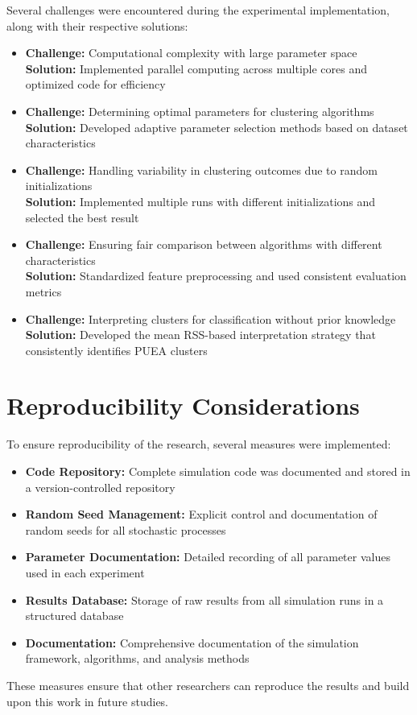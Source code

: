 Several challenges were encountered during the experimental implementation, along with their respective solutions:

\begin{itemize}
    \item \textbf{Challenge:} Computational complexity with large parameter space\\
    \textbf{Solution:} Implemented parallel computing across multiple cores and optimized code for efficiency
    
    \item \textbf{Challenge:} Determining optimal parameters for clustering algorithms\\
    \textbf{Solution:} Developed adaptive parameter selection methods based on dataset characteristics
    
    \item \textbf{Challenge:} Handling variability in clustering outcomes due to random initializations\\
    \textbf{Solution:} Implemented multiple runs with different initializations and selected the best result
    
    \item \textbf{Challenge:} Ensuring fair comparison between algorithms with different characteristics\\
    \textbf{Solution:} Standardized feature preprocessing and used consistent evaluation metrics
    
    \item \textbf{Challenge:} Interpreting clusters for classification without prior knowledge\\
    \textbf{Solution:} Developed the mean RSS-based interpretation strategy that consistently identifies PUEA clusters
\end{itemize}

\section{Reproducibility Considerations}

To ensure reproducibility of the research, several measures were implemented:

\begin{itemize}
    \item \textbf{Code Repository:} Complete simulation code was documented and stored in a version-controlled repository
    
    \item \textbf{Random Seed Management:} Explicit control and documentation of random seeds for all stochastic processes
    
    \item \textbf{Parameter Documentation:} Detailed recording of all parameter values used in each experiment
    
    \item \textbf{Results Database:} Storage of raw results from all simulation runs in a structured database
    
    \item \textbf{Documentation:} Comprehensive documentation of the simulation framework, algorithms, and analysis methods
\end{itemize}

These measures ensure that other researchers can reproduce the results and build upon this work in future studies.
